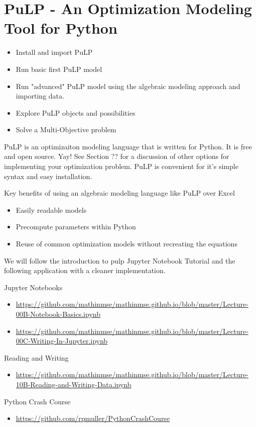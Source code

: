 \section{PuLP - An Optimization Modeling Tool for Python}
\begin{outcome}
\begin{itemize}
\item Install and import PuLP
\item Run basic first PuLP model
\item Run "advanced" PuLP model using the algebraic modeling approach and importing data.
\item Explore PuLP objects and possibilities
\item Solve a Multi-Objective problem
\end{itemize}
\end{outcome}




PuLP is an optimizaiton modeling language that is written for Python.  It is free and open source.  Yay!   See Section ?? for a discussion of other options for implementing your optimization problem.
PuLP is convenient for it's simple syntax and easy installation.   
 
Key benefits of using an algebraic modeling language like PuLP over Excel
\begin{itemize}
\item Easily readable models
\item Precompute parameters within Python
\item Reuse of common optimization models without recreating the equations
\end{itemize}

We will follow the introduction to pulp Jupyter Notebook Tutorial and the following application with a cleaner implementation.








\begin{resource}
Jupyter Notebooks
\begin{itemize}
\item \url{https://github.com/mathinmse/mathinmse.github.io/blob/master/Lecture-00B-Notebook-Basics.ipynb}
\item \url{https://github.com/mathinmse/mathinmse.github.io/blob/master/Lecture-00C-Writing-In-Jupyter.ipynb}
\end{itemize}
Reading and Writing
\begin{itemize}
\item \url{https://github.com/mathinmse/mathinmse.github.io/blob/master/Lecture-10B-Reading-and-Writing-Data.ipynb}
\end{itemize}
Python Crash Course
\begin{itemize}
\item \url{https://github.com/rpmuller/PythonCrashCourse}
\end{itemize}
\end{resource}



